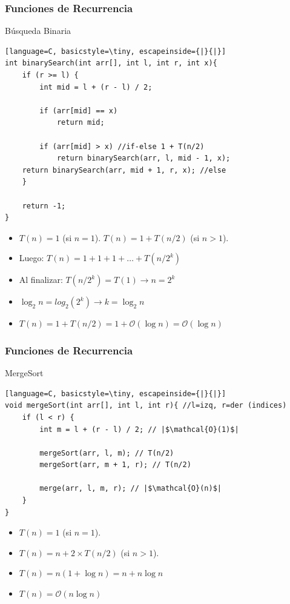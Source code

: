 \documentclass{beamer}
\begin{document}
\begin{frame}[fragile]
 \frametitle{Funciones de Recurrencia}
\small
\begin{exampleblock}{Búsqueda Binaria}
\begin{lstlisting}[language=C, basicstyle=\tiny, escapeinside={|}{|}]
int binarySearch(int arr[], int l, int r, int x){
    if (r >= l) {
        int mid = l + (r - l) / 2;

        if (arr[mid] == x) 
            return mid;

        if (arr[mid] > x) //if-else 1 + T(n/2)
            return binarySearch(arr, l, mid - 1, x);
	return binarySearch(arr, mid + 1, r, x); //else
    }

    return -1;
}
\end{lstlisting}
\end{exampleblock}


\begin{itemize}
\item $T(n) = 1$ (si $n = 1$). $T(n) = 1+ T(n/2) $ (si $n > 1$).
\item Luego: $T(n) = 1 + 1 + 1 + \dots + T(n/2^k)$ \pause
\item Al finalizar: $T(n/2^k) = T(1) \rightarrow n = 2^k$ \pause
\item $\log_2 n  = log_2(2^k) \rightarrow k = \log_2 n $ \pause 
\item $ T(n) = 1 + T(n/2) = 1 + \mathcal{O}(\log n) = \mathcal{O}(\log n)$
\end{itemize}
\end{frame}


\begin{frame}[fragile]
 \frametitle{Funciones de Recurrencia}
\small
\begin{exampleblock}{MergeSort}
\begin{lstlisting}[language=C, basicstyle=\tiny, escapeinside={|}{|}]
void mergeSort(int arr[], int l, int r){ //l=izq, r=der (indices)
    if (l < r) {
        int m = l + (r - l) / 2; // |$\mathcal{O}(1)$|

        mergeSort(arr, l, m); // T(n/2)
        mergeSort(arr, m + 1, r); // T(n/2)

        merge(arr, l, m, r); // |$\mathcal{O}(n)$| 
    }
}
\end{lstlisting}
\end{exampleblock}


\begin{itemize}
\item $T(n) = 1$ (si $n = 1$).
\item $T(n) = n + 2 \times T(n/2) $ (si $n > 1$).
\item $T(n) = n (1 + \log n) = n + n \log n$
\item $T(n) = \mathcal{O}(n \log n) $
\end{itemize}
\end{frame}
\end{document}
